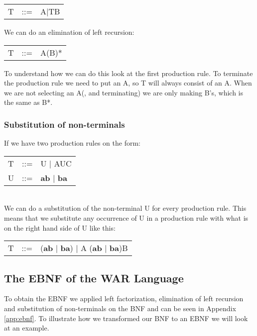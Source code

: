 			\begin{tabular}{l l l}
			\centering
				T		&	::=		&	A$\mid$TB \\
			\end{tabular}
			
			We can do an elimination of left recursion: \\
			
			\begin{tabular}{l l l}
			\centering
				T		&	::=		&	A(B)* \\
			\end{tabular}
			
			To understand how we can do this look at the first production rule. To terminate the production rule we need 
			to put an A, so T will always consist of an A. When we are not selecting an A(, and terminating) we are only making B's, which is
			the same as B*.
		\subsubsection*{Substitution of non-terminals}
			If we have two production rules on the form: \\
			
			\begin{tabular}{l l l}
			\centering
				T		&	::=		&	U $\mid$ AUC \\
				U		&	::=		&	{\bf ab} $\mid$ {\bf ba} \\
			\end{tabular} \\
			
			We can do a substitution of the non-terminal U for every production rule. This means that we 
			substitute any occurrence of U in a production rule with what is on the right hand side of U like this: \\
			
			\begin{tabular}{l l l}
			\centering
				T		&	::=		&	({\bf ab} $\mid$ {\bf ba}) $\mid$ A ({\bf ab} $\mid$ {\bf ba})B \\
			\end{tabular}
	\subsection{The EBNF of the WAR Language}
		To obtain the EBNF we applied left factorization, elimination of left recursion and substitution of non-terminals on the BNF 
		and can be seen in Appendix \ref{app:ebnf}.
		To illustrate how we transformed our BNF to an EBNF we will look at an example.

